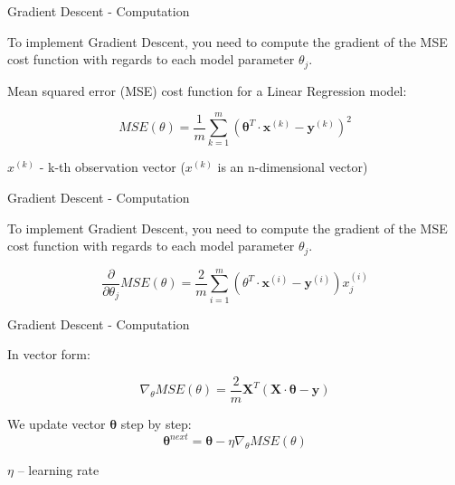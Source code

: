 \documentclass{beamer}
\begin{document}

\begin{frame}
{\centerline{Gradient Descent -  Computation }}


To implement Gradient Descent, you need to compute the gradient of the MSE cost function with regards to each model parameter $\theta_j$.

Mean squared error (MSE) cost function for a Linear Regression model:

$$MSE (\theta) = \frac{1}{m}\sum_{k=1}^{m} (\boldsymbol \theta^T \cdot \boldsymbol x^{(k)} - \boldsymbol y^{(k)})^2$$

$x^{(k)}$ - k-th observation vector ($x^{(k)}$ is an n-dimensional vector)



\end{frame}


\begin{frame}
{\centerline{Gradient Descent -  Computation }}


To implement Gradient Descent, you need to compute the gradient of the MSE cost function with regards to each model parameter $\theta_j$.

$$\frac{\partial}{\partial \theta_j}MSE(\theta) = \frac{2}{m} \sum_{i=1}^{m}(\theta^T \cdot \boldsymbol x^{(i)} - \boldsymbol y^{(i)}  ) x_j^{(i)}$$
\end{frame}


\begin{frame}
{\centerline{Gradient Descent -  Computation  }}
In vector form:

$$\nabla_{\theta} MSE(\theta) = \frac{2}{m} \boldsymbol X^T (\boldsymbol X \cdot \boldsymbol \theta - \boldsymbol y)$$

We update vector $\boldsymbol \theta$ step by step:
$$\boldsymbol \theta^{next} = \boldsymbol \theta - \eta \nabla_{\theta} MSE(\theta) $$

$\eta$ -- learning rate
\end{frame}
\end{document}
